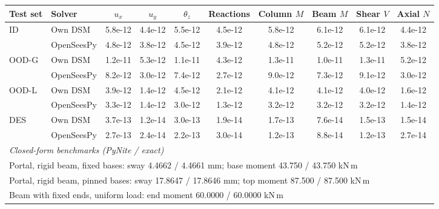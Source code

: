 \begin{tabular}{llcccccccc}
\toprule
Test set & Solver & $u_x$ & $u_y$ & $\theta_z$ & Reactions & Column $M$ & Beam $M$ & Shear $V$ & Axial $N$\\
\midrule
ID & Own DSM & 5.8e-12 & 4.4e-12 & 5.5e-12 & 4.5e-12 & 5.8e-12 & 6.1e-12 & 6.1e-12 & 4.4e-12\\
 & OpenSeesPy & 4.8e-12 & 3.8e-12 & 4.5e-12 & 3.9e-12 & 4.8e-12 & 5.2e-12 & 5.2e-12 & 3.8e-12\\
OOD-G & Own DSM & 1.2e-11 & 5.3e-12 & 1.1e-11 & 4.3e-12 & 1.3e-11 & 1.0e-11 & 1.3e-11 & 5.2e-12\\
 & OpenSeesPy & 8.2e-12 & 3.0e-12 & 7.4e-12 & 2.7e-12 & 9.0e-12 & 7.3e-12 & 9.1e-12 & 3.0e-12\\
OOD-L & Own DSM & 3.9e-12 & 1.4e-12 & 4.5e-12 & 2.1e-12 & 4.1e-12 & 4.1e-12 & 4.0e-12 & 1.6e-12\\
 & OpenSeesPy & 3.3e-12 & 1.4e-12 & 3.0e-12 & 1.3e-12 & 3.2e-12 & 3.2e-12 & 3.2e-12 & 1.4e-12\\
DES & Own DSM & 3.7e-13 & 1.2e-14 & 3.0e-13 & 1.9e-14 & 1.7e-13 & 7.6e-14 & 1.5e-13 & 1.5e-14\\
 & OpenSeesPy & 2.7e-13 & 2.4e-14 & 2.2e-13 & 3.0e-14 & 1.2e-13 & 8.8e-14 & 1.2e-13 & 2.7e-14\\
\midrule
\multicolumn{10}{l}{\textit{Closed-form benchmarks (PyNite / exact)}}\\
\multicolumn{10}{l}{Portal, rigid beam, fixed bases: sway 4.4662 / 4.4661 mm; base moment 43.750 / 43.750 kN\,m}\\
\multicolumn{10}{l}{Portal, rigid beam, pinned bases: sway 17.8647 / 17.8646 mm; top moment 87.500 / 87.500 kN\,m}\\
\multicolumn{10}{l}{Beam with fixed ends, uniform load: end moment 60.0000 / 60.0000 kN\,m}\\
\bottomrule
\end{tabular}

